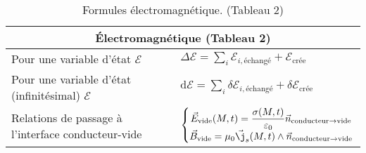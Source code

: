 \documentclass[10pt,a4paper,titlepage,landscape]{article}
\renewcommand{\arraystretch}{2}
\begin{document}
\begin{table}[H]
    \centering
    \renewcommand{\arraystretch}{1.5} %
    \setlength{\tabcolsep}{8pt} %
    \begin{tabular}{@{}|p{9cm}|p{10cm}@{}|}

        \multicolumn{2}{c}{\textbf{Électromagnétique (Tableau 2)}} \\ \hline

    Pour une variable d'état $\mathcal{E}$ & $\displaystyle \Delta \mathcal{E} = \sum\limits_{i} \mathcal{E}_{i, \text{échangé}} + \mathcal{E}_{\text{crée}}$ \\ \hline 
    Pour une variable d'état (infinitésimal) $\mathcal{E}$ & $\displaystyle \text{d} \mathcal{E} = \sum\limits_{i} \delta\mathcal{E}_{i, \text{échangé}} + \delta \mathcal{E}_{\text{crée}}$ \\ \hline 
    Relations de passage à l'interface conducteur-vide & $\left\{\begin{matrix} \vec{E}_{\text{vide}}(M,t) = \dfrac{\sigma(M,t)}{\varepsilon_0}\vec{n}_{\text{conducteur} \to \text{vide}} \\ \vec{B}_{\text{vide}} = \mu_0 \vec{\j}_s(M,t)\wedge \vec{n}_{\text{conducteur} \to \text{vide}}\end{matrix}\right.$ \\ \hline
    \end{tabular}
\caption{Formules électromagnétique. (Tableau 2)}
\label{tab:electromag2}
\end{table}
\end{document}
